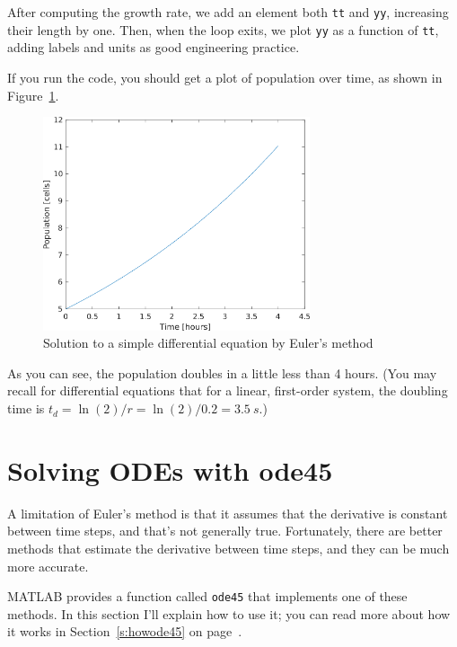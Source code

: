 After computing the growth rate, we add an element both \lstinline{tt} and \lstinline{yy}, increasing their length by one.  Then, when the loop exits, we plot \lstinline{yy} as a function of \lstinline{tt}, adding labels and units as good engineering practice.

If you run the code, you should get a plot of population over time, as shown in Figure~\ref{fig:euler}.

\begin{figure}[ht!]
\centerline{\includegraphics[width=0.7\textwidth]{images/euler.png}}
\caption{Solution to a simple differential equation by Euler's method}
\label{fig:euler}
\end{figure}

As you can see, the population doubles in a little less than 4 hours.  (You may recall for differential equations that for a linear, first-order system, the doubling time is $t_d = \ln(2)/r  = \ln(2)/0.2 = \SI{3.5}{s}$.)

\clearpage

\section{Solving ODEs with ode45}
\label{ode45}

A limitation of Euler's method is that it assumes that the derivative is constant between time steps, and that's not generally true.  Fortunately, there are better methods that estimate the derivative between time steps, and  they can be much more accurate.


MATLAB provides a function called \lstinline{ode45} that implements one of these methods.  In this section I'll explain how to use it; you can read more about how it works in Section~\ref{s:howode45} on page~\pageref{s:howode45}.

